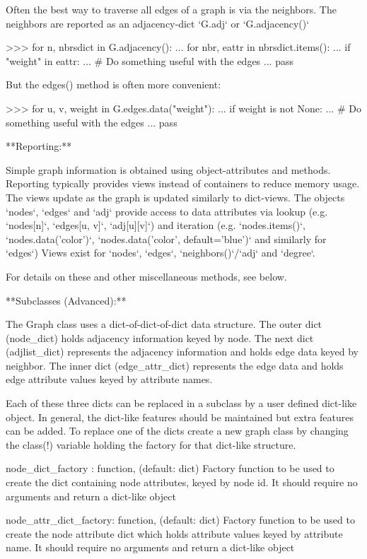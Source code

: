 \begin{DoxyVerb}
Often the best way to traverse all edges of a graph is via the neighbors.
The neighbors are reported as an adjacency-dict `G.adj` or `G.adjacency()`

>>> for n, nbrsdict in G.adjacency():
...     for nbr, eattr in nbrsdict.items():
...         if "weight" in eattr:
...             # Do something useful with the edges
...             pass

But the edges() method is often more convenient:

>>> for u, v, weight in G.edges.data("weight"):
...     if weight is not None:
...         # Do something useful with the edges
...         pass

**Reporting:**

Simple graph information is obtained using object-attributes and methods.
Reporting typically provides views instead of containers to reduce memory
usage. The views update as the graph is updated similarly to dict-views.
The objects `nodes`, `edges` and `adj` provide access to data attributes
via lookup (e.g. `nodes[n]`, `edges[u, v]`, `adj[u][v]`) and iteration
(e.g. `nodes.items()`, `nodes.data('color')`,
`nodes.data('color', default='blue')` and similarly for `edges`)
Views exist for `nodes`, `edges`, `neighbors()`/`adj` and `degree`.

For details on these and other miscellaneous methods, see below.

**Subclasses (Advanced):**

The Graph class uses a dict-of-dict-of-dict data structure.
The outer dict (node_dict) holds adjacency information keyed by node.
The next dict (adjlist_dict) represents the adjacency information and holds
edge data keyed by neighbor.  The inner dict (edge_attr_dict) represents
the edge data and holds edge attribute values keyed by attribute names.

Each of these three dicts can be replaced in a subclass by a user defined
dict-like object. In general, the dict-like features should be
maintained but extra features can be added. To replace one of the
dicts create a new graph class by changing the class(!) variable
holding the factory for that dict-like structure.

node_dict_factory : function, (default: dict)
    Factory function to be used to create the dict containing node
    attributes, keyed by node id.
    It should require no arguments and return a dict-like object

node_attr_dict_factory: function, (default: dict)
    Factory function to be used to create the node attribute
    dict which holds attribute values keyed by attribute name.
    It should require no arguments and return a dict-like object


\end{DoxyVerb}
